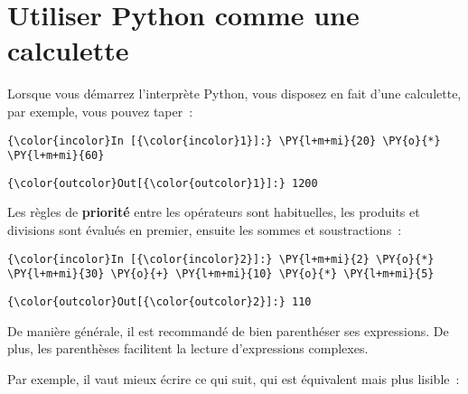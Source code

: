     
    
    
    

    

    \hypertarget{utiliser-python-comme-une-calculette}{%
\section{Utiliser Python comme une
calculette}\label{utiliser-python-comme-une-calculette}}

    Lorsque vous démarrez l'interprète Python, vous disposez en fait d'une
calculette, par exemple, vous pouvez taper~:

    \begin{Verbatim}[commandchars=\\\{\},frame=single,framerule=0.3mm,rulecolor=\color{cellframecolor}]
{\color{incolor}In [{\color{incolor}1}]:} \PY{l+m+mi}{20} \PY{o}{*} \PY{l+m+mi}{60}
\end{Verbatim}


\begin{Verbatim}[commandchars=\\\{\},frame=single,framerule=0.3mm,rulecolor=\color{cellframecolor}]
{\color{outcolor}Out[{\color{outcolor}1}]:} 1200
\end{Verbatim}
            
    Les règles de \textbf{priorité} entre les opérateurs sont habituelles,
les produits et divisions sont évalués en premier, ensuite les sommes et
soustractions~:

    \begin{Verbatim}[commandchars=\\\{\},frame=single,framerule=0.3mm,rulecolor=\color{cellframecolor}]
{\color{incolor}In [{\color{incolor}2}]:} \PY{l+m+mi}{2} \PY{o}{*} \PY{l+m+mi}{30} \PY{o}{+} \PY{l+m+mi}{10} \PY{o}{*} \PY{l+m+mi}{5}
\end{Verbatim}


\begin{Verbatim}[commandchars=\\\{\},frame=single,framerule=0.3mm,rulecolor=\color{cellframecolor}]
{\color{outcolor}Out[{\color{outcolor}2}]:} 110
\end{Verbatim}
            
    De manière générale, il est recommandé de bien parenthéser ses
expressions. De plus, les parenthèses facilitent la lecture
d'expressions complexes.

Par exemple, il vaut mieux écrire ce qui suit, qui est équivalent mais
plus lisible~:

